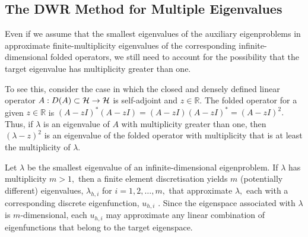 \subsection{The DWR Method for Multiple Eigenvalues}


Even if we assume that the smallest eigenvalues of the auxiliary eigenproblems in  approximate finite-multiplicity eigenvalues of the corresponding infinite-dimensional folded operators, we still need to account for the possibility that the target eigenvalue has multiplicity greater than one.

To see this, consider the case in which the closed and densely defined linear operator $A:D(A) \subset \mathcal{H} \rightarrow \mathcal{H}$ is self-adjoint and $z \in \mathbb{R}$.
The folded operator for a given $z \in \mathbb{R}$ is  $(A-zI)^*(A-zI) = (A-zI)(A-zI)^* = (A-zI)^2.$ Thus, if $\lambda$ is an eigenvalue of $A$ with multiplicity greater than one, then $(\lambda - z)^2$ is an eigenvalue of the folded operator with multiplicity that is at least the multiplicity of $\lambda.$ 




Let $\lambda$ be the smallest eigenvalue of an infinite-dimensional eigenproblem. If $\lambda$ has multiplicity $m > 1,$ then a finite element discretisation yields $m$ (potentially different) eigenvalues, $\lambda_{h, i}$ for $i = 1, 2, \dots, m,$ that approximate $\lambda,$ each with a corresponding discrete eigenfunction, $u_{h, i}$ \cite{Boffi, slep}. Since the eigenspace associated with $\lambda$ is $m$-dimensional, each $u_{h, i}$ may approximate any linear combination of eigenfunctions that belong to the target eigenspace. 






